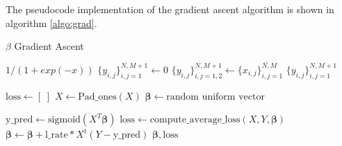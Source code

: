 \documentclass[journal]{IEEEtran}
\begin{document}
The pseudocode implementation of the gradient ascent algorithm is shown in algorithm \ref{algo:grad}.
\begin{algorithm}
\caption{$\beta$ Gradient Ascent}\label{algo:grad}
\begin{algorithmic}[1]
\Return $1/(1 + exp(-x))$
\EndProcedure
{}
\State $\{y_{i,j}\}_{i,j=1}^{N,M+1} \gets 0$
\State $\{y_{i,j}\}_{i,j=1,2}^{N,M+1} \gets \{x_{i,j}\}_{i,j=1}^{N,M}$
\Return $\{y_{i,j}\}_{i,j=1}^{N,M+1}$
\EndProcedure

\State $\text{loss} \gets [\;]$
\State $X \gets \text{Pad\_ones}(X)$
\State $\bm{\beta} \gets \text{random uniform vector}$

    \State $\text{y\_pred} \gets \text{sigmoid}(X^T \bm{\beta})$
    \State $\text{loss} \gets \text{compute\_average\_loss}(X, Y, \bm{\beta})$
    \State $\bm{\beta} \gets \bm{\beta} + \text{l\_rate} * X^t (Y-\text{y\_pred})$
\Return $\bm{\beta}, \text{loss}$
\EndFor
\EndProcedure

\end{algorithmic}
\end{algorithm}
\end{document}
